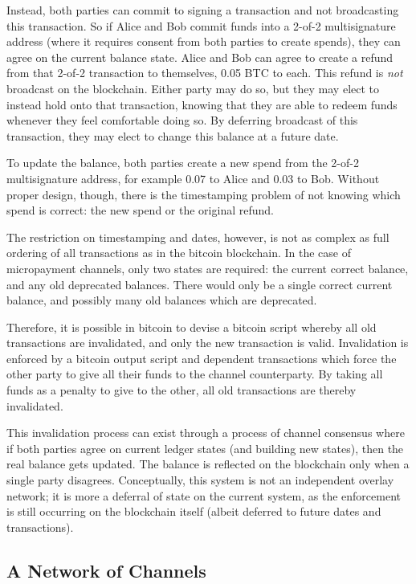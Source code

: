 \documentclass[letterpaper,11pt]{article}
\begin{document}
Instead, both parties can commit to signing a transaction and not broadcasting
this transaction. So if Alice and Bob commit funds into a 2-of-2 multisignature
address (where it requires consent from both parties to create spends), they
can agree on the current balance state. Alice and Bob can agree to create a
refund from that 2-of-2 transaction to themselves, 0.05 BTC to each. This
refund is \textit{not} broadcast on the blockchain. Either party may do so, but
they may elect to instead hold onto that transaction, knowing that they are
able to redeem funds whenever they feel comfortable doing so. By deferring
broadcast of this transaction, they may elect to change this balance at a
future date.

To update the balance, both parties create a new spend from the 2-of-2
multisignature address, for example 0.07 to Alice and 0.03 to Bob. Without
proper design, though, there is the timestamping problem of not knowing which
spend is correct: the new spend or the original refund.

The restriction on timestamping and dates, however, is not as complex as full
ordering of all transactions as in the bitcoin blockchain. In the case of
micropayment channels, only two states are required: the current correct
balance, and any old deprecated balances. There would only be a single correct
current balance, and possibly many old balances which are deprecated.

Therefore, it is possible in bitcoin to devise a bitcoin script whereby all old
transactions are invalidated, and only the new transaction is valid.
Invalidation is enforced by a bitcoin output script and dependent transactions
which force the other party to give all their funds to the channel
counterparty. By taking all funds as a penalty to give to the other, all old
transactions are thereby invalidated.

This invalidation process can exist through a process of channel consensus
where if both parties agree on current ledger states (and building new states),
then the real balance gets updated. The balance is reflected on the blockchain
only when a single party disagrees. Conceptually, this system is not an
independent overlay network; it is more a deferral of state on the current
system, as the enforcement is still occurring on the blockchain itself (albeit
deferred to future dates and transactions).

\subsection{A Network of Channels}
\end{document}
